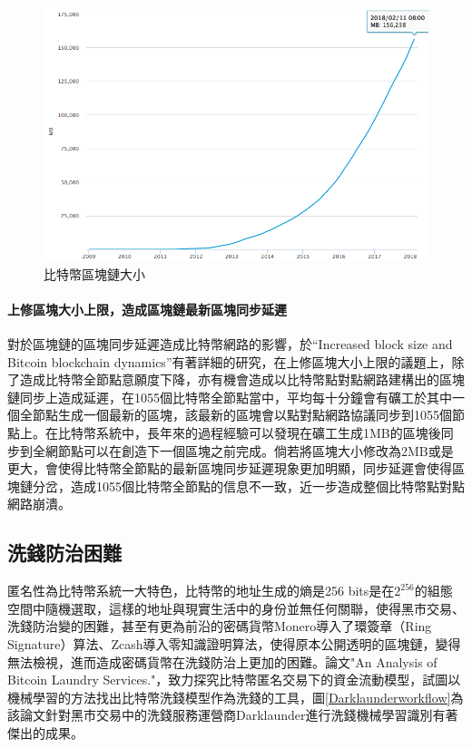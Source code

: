 			\begin{figure}[h]
				\centering
				\includegraphics[width = .7\textwidth]{blockchainsize.png}
				\caption{比特幣區塊鏈大小\supercite{blockchainsize}}\label{blockchainsize}
			\end{figure}

			\paragraph{上修區塊大小上限，造成區塊鏈最新區塊同步延遲}
			對於區塊鏈的區塊同步延遲造成比特幣網路的影響，於“Increased block size and Bitcoin blockchain dynamics”\supercite{TelecommunicationNetworksandApplicationsConferenceITNAC201727thInternational}有著詳細的研究，在上修區塊大小上限的議題上，除了造成比特幣全節點意願度下降，亦有機會造成以比特幣點對點網路建構出的區塊鏈同步上造成延遲，在1055個比特幣全節點當中，平均每十分鐘會有礦工於其中一個全節點生成一個最新的區塊，該最新的區塊會以點對點網路協議同步到1055個節點上。在比特幣系統中，長年來的過程經驗可以發現在礦工生成1MB的區塊後同步到全網節點可以在創造下一個區塊之前完成。倘若將區塊大小修改為2MB或是更大，會使得比特幣全節點的最新區塊同步延遲現象更加明顯，同步延遲會使得區塊鏈分岔，造成1055個比特幣全節點的信息不一致，近一步造成整個比特幣點對點網路崩潰。

		\subsection{洗錢防治困難}
		匿名性為比特幣系統一大特色，比特幣的地址生成的熵是256 bits是在$2^{256}$的組態空間中隨機選取，這樣的地址與現實生活中的身份並無任何關聯，使得黑市交易、洗錢防治變的困難，甚至有更為前沿的密碼貨幣Monero\supercite{noether2014monero}導入了環簽章（Ring Signature）\supercite{Thresholdringsignaturesandapplicationstoad-hocgroups}算法、Zcash\supercite{zhong2002faster}導入零知識證明算法\supercite{Zero-KnowledgeProofsofIdentity}，使得原本公開透明的區塊鏈，變得無法檢視，進而造成密碼貨幣在洗錢防治上更加的困難。論文"An Analysis of Bitcoin Laundry Services."\supercite{AnAnalysisofBitcoinLaundryServices}，致力探究比特幣匿名交易下的資金流動模型，試圖以機械學習的方法找出比特幣洗錢模型作為洗錢的工具，圖\ref{Darklaunderworkflow}為該論文針對黑市交易中的洗錢服務運營商Darklaunder進行洗錢機械學習識別有著傑出的成果。

